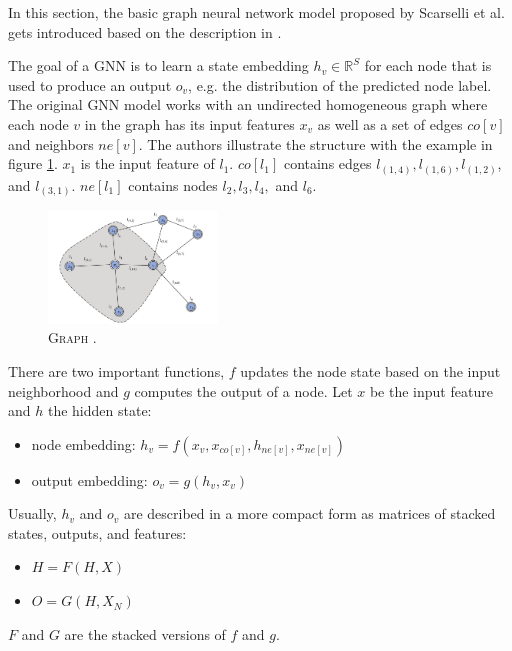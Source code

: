 \documentclass[a4paper,preprint]{sig-alternate}
\begin{document}
In this section, the basic graph neural network model proposed by Scarselli et al. \cite{4700287} gets introduced
based on the description in \cite{article}.\newline

The goal of a GNN is to learn a state embedding $h_v \in \mathbb{R}^S$ for each node that is used to produce an 
output $o_v$, e.g. the distribution of the predicted node label.
The original GNN model works with an undirected homogeneous graph where each node $v$ in the graph has its input features $x_v$
as well as a set of edges $co[v]$ and neighbors $ne[v]$.\newline
The authors illustrate the structure with the example in figure \ref{fig:graph}.
$x_{1}$ is the input feature of $l_1$. $co[l_1]$ contains edges $l_{(1, 4)}, l_{(1, 6)}, l_{(1, 2)}$, and $l_{(3, 1)}$. $ne[l_1]$ contains nodes $l_2, l_3,
l_4,$ and $l_6$.

\begin{figure}[h]
    \centering
    \includegraphics[width=0.4\textwidth]{img/graph.png}
    \caption{\textsc{Graph} \cite{goodfellow2015explaining}.}
    \label{fig:graph}
\end{figure}

There are two important functions, $f$ updates the node state based on the input neighborhood and $g$ computes the output of a node.\newline
Let $x$ be the input feature and $h$ the hidden state:
\begin{itemize}
    \item node embedding: $h_v = f(x_v, x_{co[v]}, h_{ne[v]}, x_{ne[v]})$
    \item output embedding: $o_v = g(h_v, x_v)$
\end{itemize}

Usually, $h_v$ and $o_v$ are described in a more compact form as matrices of stacked states,
outputs, and features:
\begin{itemize}
    \item $H = F(H, X)$
    \item $O = G(H, X_N)$
\end{itemize}
$F$ and $G$ are the stacked versions of $f$ and $g$.\newline
\end{document}
